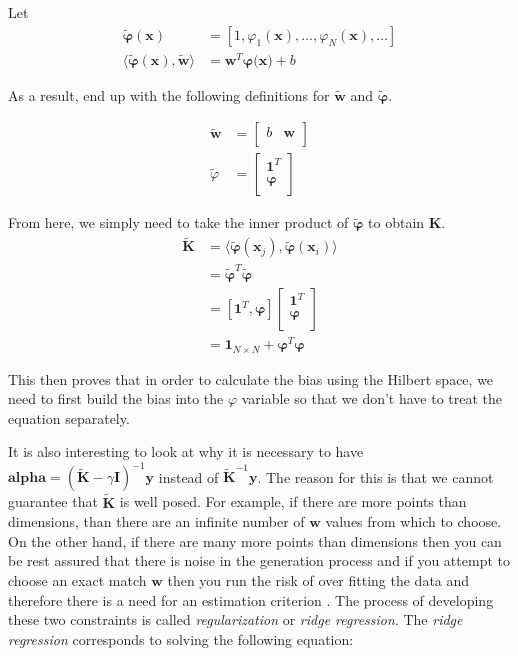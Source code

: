 \documentclass[11pt, twoside]{article}   	%
\begin{document}
Let 
\begin{align*}
\mathbf{\widetilde{\varphi}(x)} &= [1, \varphi_1(\mathbf{x}),  \ldots, \varphi_N(\mathbf{x}), \ldots ] \\
\langle\mathbf{\widetilde{\varphi}(x)}, \mathbf{\widetilde{w}} \rangle &= \mathbf{w}^T\mathbf{\varphi(\mathbf{x}}) + b 
\end{align*}

As a result, end up with the following definitions for $\mathbf{\widetilde{w}}$ and $\mathbf{\widetilde{\varphi}}$.
\newcommand{\newPhi}{\mathbf{\widetilde{\varphi}}}

\begin{align*}
 \mathbf{\widetilde{w}} &= 
\begin{bmatrix}
b & \mathbf{w}  \\
\end{bmatrix} \\
\widetilde{\varphi} &= 
\begin{bmatrix} 
\mathbf{1}^T \\
\mathbf{\varphi} \\
\end{bmatrix}
\end{align*}

From here, we simply need to take the inner product of $\mathbf{\widetilde{\varphi}}$ to obtain $\mathbf{K}$. 
\begin{align*}
 \widetilde{\mathbf{K} }&= \langle \newPhi(\mathbf{x}_j), \newPhi(\mathbf{x}_i) \rangle \\
 & = \newPhi^T\newPhi \\
 &= [\mathbf{1}^T, \mathbf{\varphi}] 
 \begin{bmatrix}
 \mathbf{1}^T \\
\mathbf{\varphi} \\
 \end{bmatrix} \\
 &= \mathbf{1}_{N \times N} + \mathbf{\varphi}^T\mathbf{\varphi}
\end{align*}

This then proves that in order to calculate the bias using the Hilbert space, we need to first
build the bias into the $\varphi$ variable so that we don't have to treat the equation separately. 

It is also interesting to look at why it is necessary to have $\mathbf{alpha} = (\mathbf{\widetilde{K}} - \gamma \mathbf{I})^{-1} \mathbf{y}$ 
instead of $\mathbf{\widetilde{K}}^{-1}\mathbf{y}$. The reason for this is that we cannot guarantee that $\mathbf{\widetilde{K}}$ is well posed. 
For example, if there are more points than dimensions, than there are an infinite number of $\mathbf{w}$ values from which to choose. On 
the other hand, if there are many more points than dimensions then you can be rest assured that there is noise in the generation process 
and if you attempt to choose an exact match $\mathbf{w}$ then you run the risk of over fitting the data and therefore there is a need for an 
estimation criterion \cite{kernelmethods}. The process of developing these two constraints is called \emph{regularization} or \emph{ridge regression}. 
The \emph{ridge regression} corresponds to solving the following equation: 
\end{document}
